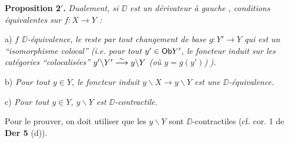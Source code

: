 \noindent\textbf{Proposition 2$'$.} \textit{Dualement, si $\DD$ est un dérivateur à gauche} \textit{, conditions équivalentes sur $f : X \to Y$ :}

a) \textit{$f$ $\DD$-équivalence,} \textit{le reste par tout changement de base $g : Y' \to Y$ qui est un “isomorphisme colocal” (i.e. pour tout $y' \in \mathsf{Ob} Y'$, le foncteur induit sur les catégories “colocalisées” $y'\backslash Y' \overset{\sim}{\longrightarrow} y\backslash Y$ (où $y = g(y')$)} \textit{).}

b) \textit{Pour tout $y \in Y$, le foncteur induit $y\backslash X \to y\backslash Y$ est une $\DD$-équivalence.}

c) \textit{Pour tout $y \in Y$, $y\backslash Y$ est $\DD$-contractile.}

\noindent Pour le prouver, on doit utiliser que les $y\backslash Y$ sont $\DD$-contractiles (cf. cor. 1 de \textbf{Der 5} (d)).

\clearpage
{}
\noindent{}

